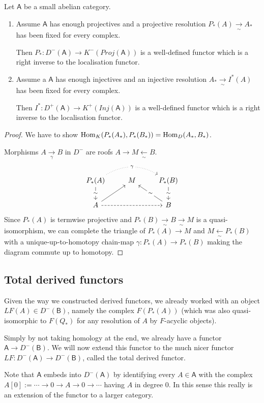 \documentclass[fontsize=11pt,fleqn,a4paper]{scrartcl}
\begin{document}
\begin{lemma}
Let $\mathsf{A}$ be a small abelian category.
\begin{multicols}{2}
\begin{enumerate}
\item Assume $\mathsf{A}$ has enough projectives and a projective resolution $P_\ast(A) \xrightarrow[\sim]{} A_\ast$ has been fixed for every complex.

Then $P_\ast: D^-(\mathsf{A}) \to K^-(Proj(\mathsf{A}))$ is a well-defined functor which is a right inverse to the localisation functor.
\item Assume a $\mathsf{A}$ has enough injectives and an injective resolution $A_\ast \xrightarrow[\sim]{} I^\ast(A)$ has been fixed for every complex.

Then $I^\ast: D^+(\mathsf{A}) \to K^+(Inj(\mathsf{A}))$ is a well-defined functor which is a right inverse to the localisation functor.
\end{enumerate}
\end{multicols}
\end{lemma}
\begin{proof}
We have to show $\operatorname{Hom}_{K}(P_\ast(A_\ast) , P_\ast(B_\ast)) = \operatorname{Hom}_D(A_\ast,B_\ast)$.

Morphisms $A\xrightarrow[\gamma]{} B$ in $D^-$ are roofs $A \to M \xleftarrow[\sim]{} B$.
\[\begin{tikzcd}
P_\ast(A) \ar[rr,dotted,bend left,"\gamma" description] \ar[d,"\sim" description] & M & P_\ast(B) \ar[d,"\sim" description] \\
A \ar[rr,dashed] \ar[ru] && B \ar[lu,"\sim" description]
\end{tikzcd}\]
Since $P_\ast(A)$ is termwise projective and $P_\ast(B) \xrightarrow[\sim]{}B \xrightarrow[\sim]{} M$ is a quasi-isomorphism, we can complete the triangle of $P_\ast(A) \to M$ and $M\xleftarrow[\sim]{} P_\ast(B)$ with a unique-up-to-homotopy chain-map $\gamma: P_\ast(A) \to P_\ast(B)$ making the diagram commute up to homotopy.
\end{proof}

\subsection{Total derived functors}

\begin{remark}
Given the way we constructed derived functors, we already worked with an object $LF(A)\in D^-(\mathsf{B})$, namely the complex $F(P_\ast(A))$ (which was also quasi-isomorphic to $F(Q_\ast)$ for any resolution of $A$ by $F$-acyclic objects).

Simply by not taking homology at the end, we already have a functor $\mathsf{A} \to D^-(\mathsf{B})$. We will now extend this functor to the much nicer functor $LF: D^-(\mathsf{A}) \to D^-(\mathsf{B})$, called the total derived functor.

Note that $\mathsf{A}$ embeds into $D^-(\mathsf{A})$ by identifying every $A\in\mathsf{A}$ with the complex $A[0] := \cdots \to 0 \to A\to 0\to\cdots$ having $A$ in degree $0$. In this sense this really is an extension of the functor to a larger category.
\end{remark}
\end{document}
